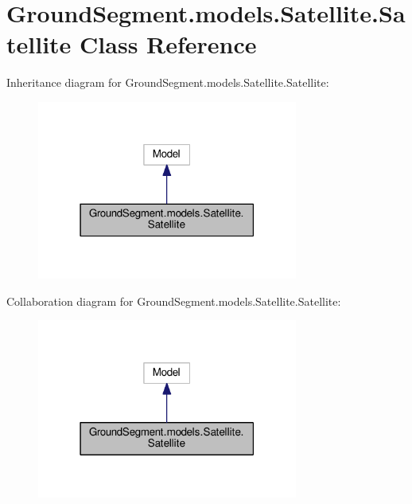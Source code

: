 \hypertarget{class_ground_segment_1_1models_1_1_satellite_1_1_satellite}{}\section{Ground\+Segment.\+models.\+Satellite.\+Satellite Class Reference}
\label{class_ground_segment_1_1models_1_1_satellite_1_1_satellite}


Inheritance diagram for Ground\+Segment.\+models.\+Satellite.\+Satellite\+:\nopagebreak
\begin{figure}[H]
\begin{center}
\leavevmode
\includegraphics[width=243pt]{class_ground_segment_1_1models_1_1_satellite_1_1_satellite__inherit__graph}
\end{center}
\end{figure}


Collaboration diagram for Ground\+Segment.\+models.\+Satellite.\+Satellite\+:\nopagebreak
\begin{figure}[H]
\begin{center}
\leavevmode
\includegraphics[width=243pt]{class_ground_segment_1_1models_1_1_satellite_1_1_satellite__coll__graph}
\end{center}
\end{figure}
